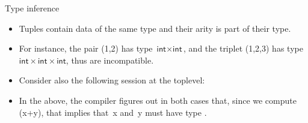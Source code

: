 %
\begin{frame}{Type inference}

  \begin{itemize}

    \item Tuples contain data of the same type and their arity is part
      of their type.

    \item For instance, the pair \textsf{(1,2)} has type $\textsf{int}
      \times \textsf{int}$, and the triplet \textsf{(1,2,3)} has type
      $\textsf{int} \times \textsf{int} \times \textsf{int}$, thus
      are incompatible.

    \item Consider also the following session at the \OCaml
      toplevel:
      \medskip

      \noindent{}

      \noindent{}

      \medskip

      \noindent{}

      \noindent{}

      \smallskip

    \item In the above, the \OCaml compiler figures out in both cases
      that, since we compute \textsf{(x+y)}, that implies
      that~\textsf{x} and~\textsf{y} must have type .
  \end{itemize}

\end{frame}

